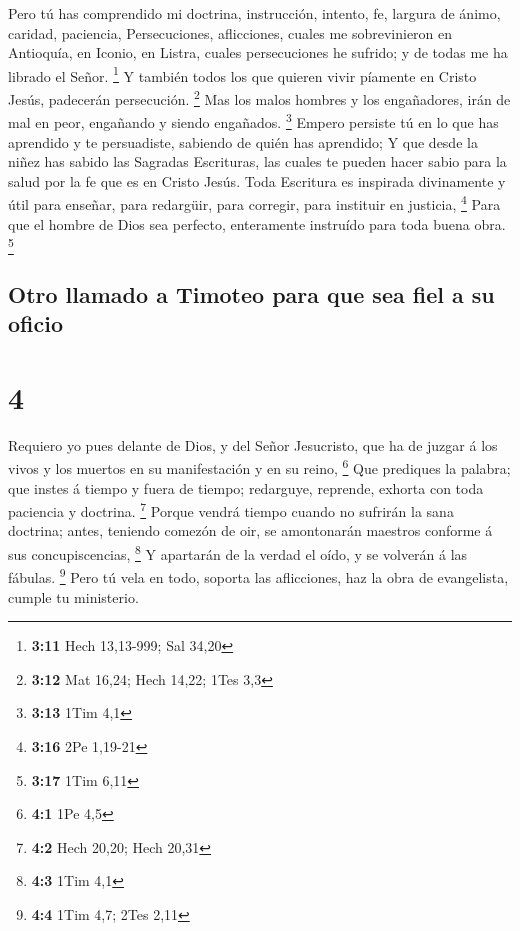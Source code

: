  Pero tú has comprendido mi doctrina, instrucción, intento,
fe, largura de ánimo, caridad, paciencia,  Persecuciones,
aflicciones, cuales me sobrevinieron en Antioquía, en Iconio, en Listra,
cuales persecuciones he sufrido; y de todas me ha librado el Señor.
\footnote{\textbf{3:11} Hech 13,13-999; Sal 34,20}  Y
también todos los que quieren vivir píamente en Cristo Jesús, padecerán
persecución. \footnote{\textbf{3:12} Mat 16,24; Hech 14,22; 1Tes 3,3}
 Mas los malos hombres y los engañadores, irán de mal en
peor, engañando y siendo engañados. \footnote{\textbf{3:13} 1Tim 4,1}
 Empero persiste tú en lo que has aprendido y te
persuadiste, sabiendo de quién has aprendido;  Y que desde
la niñez has sabido las Sagradas Escrituras, las cuales te pueden hacer
sabio para la salud por la fe que es en Cristo Jesús.  Toda
Escritura es inspirada divinamente y útil para enseñar, para redargüir,
para corregir, para instituir en justicia, \footnote{\textbf{3:16} 2Pe
  1,19-21}  Para que el hombre de Dios sea perfecto,
enteramente instruído para toda buena obra. \footnote{\textbf{3:17} 1Tim
  6,11}

\hypertarget{otro-llamado-a-timoteo-para-que-sea-fiel-a-su-oficio}{%
\subsection{Otro llamado a Timoteo para que sea fiel a su
oficio}\label{otro-llamado-a-timoteo-para-que-sea-fiel-a-su-oficio}}

\hypertarget{section-3}{%
\section{4}\label{section-3}}

 Requiero yo pues delante de Dios, y del Señor Jesucristo,
que ha de juzgar á los vivos y los muertos en su manifestación y en su
reino, \footnote{\textbf{4:1} 1Pe 4,5}  Que prediques la
palabra; que instes á tiempo y fuera de tiempo; redarguye, reprende,
exhorta con toda paciencia y doctrina. \footnote{\textbf{4:2} Hech
  20,20; Hech 20,31}  Porque vendrá tiempo cuando no
sufrirán la sana doctrina; antes, teniendo comezón de oir, se
amontonarán maestros conforme á sus concupiscencias, \footnote{\textbf{4:3}
  1Tim 4,1}  Y apartarán de la verdad el oído, y se volverán
á las fábulas. \footnote{\textbf{4:4} 1Tim 4,7; 2Tes 2,11} 
Pero tú vela en todo, soporta las aflicciones, haz la obra de
evangelista, cumple tu ministerio.

